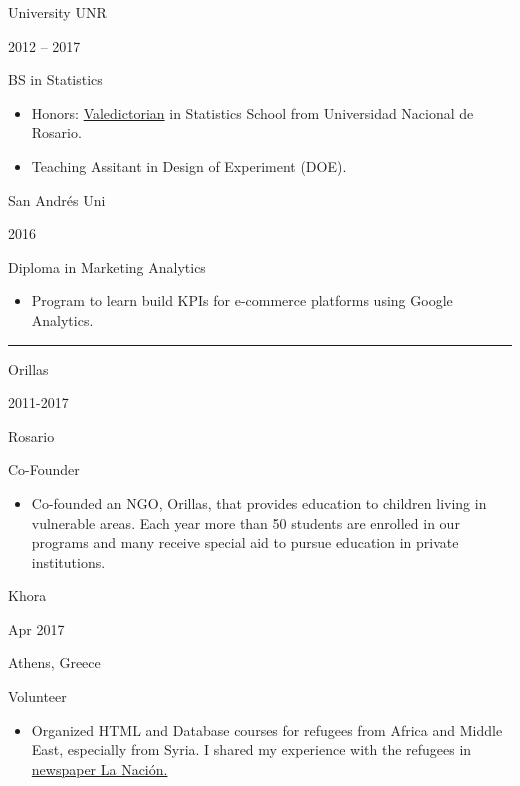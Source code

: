 \documentclass[a4paper,10pt]{article}
\newlength{\cvcolumngapwidth}
\newlength{\cvleftcolumnwidth}
\newlength{\cvrightcolumnwidth}
\newcommand{\cvsectionstyle}[1]{{\normalsize\cvsectionfont\textcolor{cvsectioncolor}{#1}}}
\newcommand{\cvtitlestyle}[1]{{\large\cvtitlefont\textcolor{cvtitlecolor}{#1}}}
\newcommand{\cvdurationstyle}[1]{{\small\cvdurationfont\textcolor{cvdurationcolor}{#1}}}
\newcommand{\cvheadingstyle}[1]{{\normalsize\cvheadingfont\textcolor{cvheadingcolor}{#1}}}
\newlength{\cvafteritemskipamount}
\newlength{\cvaftersectionskipamount}
\newlength{\cvaftertitleskipamount}
\newlength{\cvparskip}
\newcommand{\cvsection}[1]{
    \begin{minipage}[t]{\cvleftcolumnwidth}
        \raggedleft\cvsectionstyle{#1}
    \end{minipage}%
    \hspace{\cvcolumngapwidth}%
    \begin{minipage}[t]{\cvrightcolumnwidth}
        \textcolor{cvrulecolor}{\rule{\cvrightcolumnwidth}{0.3mm}}
    \end{minipage}

    \vspace{\cvaftersectionskipamount}
}
\newcommand{\cvitem}[2]{
    \begin{minipage}[t]{\cvleftcolumnwidth}
        \raggedleft #1
    \end{minipage}%
    \hspace{\cvcolumngapwidth}%
    \begin{minipage}[t]{\cvrightcolumnwidth}
        \setlength{\parskip}{\cvparskip} #2
    \end{minipage}

    \vspace{\cvafteritemskipamount}
}
\newcommand{\cvtitle}[1]{
    \cvtitlestyle{#1}

    \vspace{\cvaftertitleskipamount}
    \vspace{-\cvparskip}
}
\begin{document}
\cvitem{
    \cvheadingstyle{University UNR}

    \cvdurationstyle{2012 -- 2017}
}{
    \cvtitle{BS in Statistics}


    \begin{itemize}[leftmargin=*]
        \item Honors: \href{https://www.fcecon.unr.edu.ar/web-nueva/noticias/abanderados-2016}{Valedictorian} in Statistics School from Universidad Nacional de Rosario.
        \item Teaching Assitant in Design of Experiment (DOE).



    \end{itemize}
}

\cvitem{
    \cvheadingstyle{San Andrés Uni}

    \cvdurationstyle{2016}
}{
    \cvtitle{Diploma in Marketing Analytics}
        \begin{itemize}[leftmargin=*]
        \item Program to learn build KPIs for e-commerce platforms using Google Analytics.

    \end{itemize}



}




\pagebreak{}
\cvsection{VOLUNTEERING}

\cvitem{
    \cvheadingstyle{Orillas}

    \cvdurationstyle{2011-2017}

    \cvdurationstyle{Rosario}

}{
    \cvtitle{Co-Founder}
    \begin{itemize}[leftmargin=*]
        \item Co-founded an NGO, Orillas, that provides education to children living in vulnerable areas. Each year more than 50 students are enrolled in our programs and many receive special aid to pursue education in private institutions.
    \end{itemize}
}
\cvitem{
    \cvheadingstyle{Khora}

    \cvdurationstyle{Apr 2017}

    \cvdurationstyle{Athens, Greece}

}{
    \cvtitle{Volunteer}
    \begin{itemize}[leftmargin=*]
        \item Organized HTML and Database courses for refugees from Africa and Middle East, especially from Syria. I shared my experience with the refugees in \href{http://www.lanacion.com.ar/2035061-refugiados-en-grecia-historias-de-huidas-violencia-y-familias-separadas}{newspaper La Nación.}

    \end{itemize}
}
\end{document}
